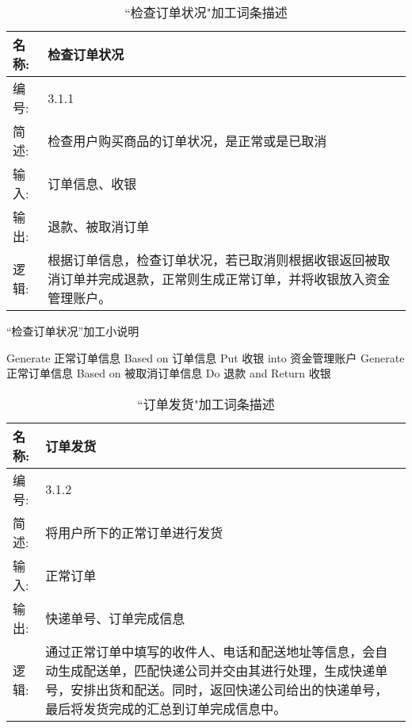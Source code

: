 
\begin{table}[H]  
\caption{``检查订单状况"加工词条描述}  
\begin{center}  
    \begin{tabular}{l p{11cm}} 
        \hline
        \quad 名称:  &   检查订单状况 \\
        \hline
        \quad 编号:  & 3.1.1 \\
        \hline
        \quad 简述:  & 检查用户购买商品的订单状况，是正常或是已取消 \\
        \hline
        \quad 输入:  & 订单信息、收银\\
        \hline
        \quad 输出:  & 退款、被取消订单 \\
        \hline
        \quad 逻辑:  & 根据订单信息，检查订单状况，若已取消则根据收银返回被取消订单并完成退款，正常则生成正常订单，并将收银放入资金管理账户。 \\
        \hline
    \end{tabular}
    \label{tab1}
\end{center}
\end{table}

\begin{algorithm}[H]
    \renewcommand{\thealgorithm}{}
    \caption{“检查订单状况”加工小说明} 
    \label{alg3} 
    \begin{algorithmic}[1]
        \STATE Generate 正常订单信息 Based on 订单信息
        \STATE Put 收银 into 资金管理账户
        \ELSE
        \STATE Generate 正常订单信息 Based on 被取消订单信息
        \STATE Do 退款 and Return 收银
        \ENDIF 
    \end{algorithmic} 
\end{algorithm}

\begin{table}[H]  
\caption{``订单发货"加工词条描述}  
\begin{center}  
    \begin{tabular}{l p{11cm}} 
        \hline
        \quad 名称:  &   订单发货 \\
        \hline
        \quad 编号:  & 3.1.2 \\
        \hline
        \quad 简述:  & 将用户所下的正常订单进行发货 \\
        \hline
        \quad 输入:  & 正常订单 \\
        \hline
        \quad 输出:  & 快递单号、订单完成信息 \\
        \hline
        \quad 逻辑:  & 通过正常订单中填写的收件人、电话和配送地址等信息，会自动生成配送单，匹配快递公司并交由其进行处理，生成快递单号，安排出货和配送。同时，返回快递公司给出的快递单号，最后将发货完成的汇总到订单完成信息中。 \\
        \hline
    \end{tabular}
    \label{tab1}
\end{center}
\end{table}

